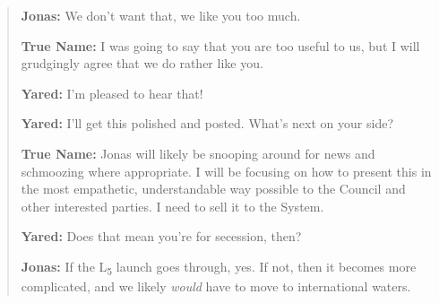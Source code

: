 \begin{quote}
\textbf{Jonas:} We don't want that, we like you too much.

\textbf{True Name:} I was going to say that you are too useful to us, but I will grudgingly agree that we do rather like you.

\textbf{Yared:} I'm pleased to hear that!

\textbf{Yared:} I'll get this polished and posted. What's next on your side?

\textbf{True Name:} Jonas will likely be snooping around for news and schmoozing where appropriate. I will be focusing on how to present this in the most empathetic, understandable way possible to the Council and other interested parties. I need to sell it to the System.

\textbf{Yared:} Does that mean you're for secession, then?

\textbf{Jonas:} If the L\textsubscript{5} launch goes through, yes. If not, then it becomes more complicated, and we likely \emph{would} have to move to international waters.
\end{quote}
